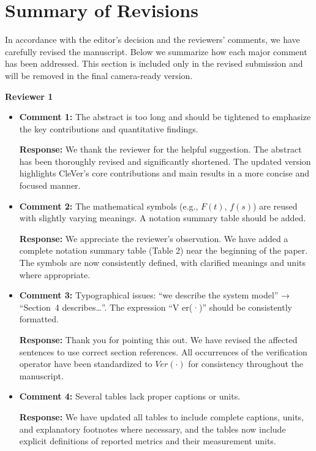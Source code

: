 \documentclass[3p]{elsarticle}
\theoremstyle{remark}
\begin{document}
\section*{Summary of Revisions}

In accordance with the editor’s decision and the reviewers’ comments, we have carefully revised the manuscript. 
Below we summarize how each major comment has been addressed. 
This section is included only in the revised submission and will be removed in the final camera-ready version.

\textbf{Reviewer 1}
\begin{itemize}

    \item \textbf{Comment 1:} 
    The abstract is too long and should be tightened to emphasize the key contributions and quantitative findings.

    \textbf{Response:}
    We thank the reviewer for the helpful suggestion. The abstract has been thoroughly revised and significantly shortened. The updated version highlights CleVer’s core contributions and main results in a more concise and focused manner.

    \item \textbf{Comment 2:}
    The mathematical symbols (e.g., $F(t)$, $f(s)$) are reused with slightly varying meanings. A notation summary table should be added.

    \textbf{Response:}
    We appreciate the reviewer’s observation. 
    We have added a complete notation summary table (Table 2) near the beginning of the paper. 
    The symbols are now consistently defined, with clarified meanings and units where appropriate.

    \item \textbf{Comment 3:}
    Typographical issues: “we describe the system model” → 
    “Section~4 describes…”. The expression “V er(·)” should be consistently formatted.

    \textbf{Response:}
    Thank you for pointing this out. 
    We have revised the affected sentences to use correct section references. All occurrences of the verification operator have been standardized to $Ver(\cdot)$ for consistency throughout the manuscript.

    \item \textbf{Comment 4:}
    Several tables lack proper captions or units.

    \textbf{Response:}
    We have updated all tables to include complete captions, units, 
    and explanatory footnotes where necessary, and the tables now include explicit definitions of reported metrics and their measurement units.


\end{itemize}
\end{document}
